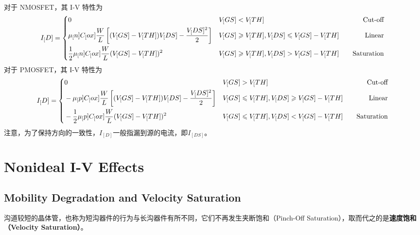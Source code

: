 对于 NMOSFET，其 I-V 特性为
\begin{equation}
    I_[D] = 
    \begin{dcases}  %
        \begin{aligned}
            & 0 && V_[GS] < V_[TH] &&& \text{Cut-off} \\
            & \mu_[n] C_[ox] \frac{W}{L} \left[ (V_[GS] - V_[TH]) V_[DS] - \frac{V_[DS]^2}{2} \right] && V_[GS] \geqslant V_[TH], V_[DS] \leqslant V_[GS] - V_[TH] &&& \text{Linear} \\
            & \frac{1}{2} \mu_[n] C_[ox] \frac{W}{L} (V_[GS] - V_[TH])^2 && V_[GS] \geqslant V_[TH], V_[DS] > V_[GS] - V_[TH] &&& \text{Saturation}
        \end{aligned}
    \end{dcases}
\end{equation}
对于 PMOSFET，其 I-V 特性为
\begin{equation}
    I_[D] = 
    \begin{dcases}  %
        \begin{aligned}
            & 0 && V_[GS] > V_[TH] &&& \text{Cut-off} \\
            & -\mu_[p] C_[ox] \frac{W}{L} \left[ (V_[GS] - V_[TH]) V_[DS] - \frac{V_[DS]^2}{2} \right] && V_[GS] \leqslant V_[TH], V_[DS] \geqslant V_[GS] - V_[TH] &&& \text{Linear} \\
            & -\frac{1}{2} \mu_[p] C_[ox] \frac{W}{L} (V_[GS] - V_[TH])^2 && V_[GS] \leqslant V_[TH], V_[DS] < V_[GS] - V_[TH] &&& \text{Saturation}
        \end{aligned}
    \end{dcases}
\end{equation}
注意，为了保持方向的一致性，$I_[D]$一般指漏到源的电流，即$I_[DS]$。

\section{Nonideal I-V Effects}

\subsection{Mobility Degradation and Velocity Saturation}

沟道较短的晶体管，也称为短沟器件的行为与长沟器件有所不同，它们不再发生夹断饱和（Pinch-Off Saturation），取而代之的是\textbf{速度饱和（Velocity Saturation）}。

